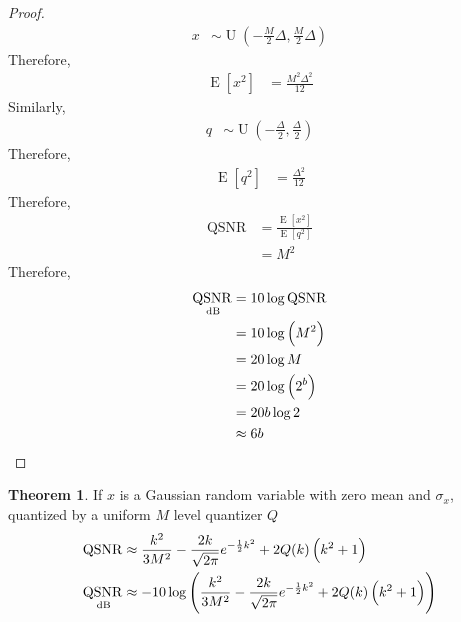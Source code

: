 \documentclass[titlepage, fleqn, a4paper, 12pt, twoside]{article}
\theoremstyle{definition}
\theoremstyle{theorem}
\newtheorem{theorem}{Theorem}
\DeclareMathOperator{\expct}{\mathrm{E}}
\DeclareMathOperator{\uniform}{\mathrm{U}}
\DeclareMathOperator{\QSNR}{\mathrm{QSNR}}
\begin{document}
\begin{proof}
	\begin{align*}
		x &\sim \uniform\left( -\frac{M}{2} \Delta,\frac{M}{2} \Delta \right)
	\end{align*}
	Therefore,
	\begin{align*}
		\expct\left[ x^2 \right] &= \frac{M^2 \Delta^2}{12}
	\end{align*}
	Similarly,
	\begin{align*}
		q &\sim \uniform\left( -\frac{\Delta}{2},\frac{\Delta}{2} \right)
	\end{align*}
	Therefore,
	\begin{align*}
		\expct\left[ q^2 \right] &= \frac{\Delta^2}{12}
	\end{align*}
	Therefore,
	\begin{align*}
		\QSNR &= \frac{\expct\left[ x^2 \right]}{\expct\left[ q^2 \right]}\\
		&= M^2
	\end{align*}
	Therefore,
	\begin{align*}
		\QSNR_{\decibel} &= 10 \log \QSNR\\
		&= 10 \log\left( M^2 \right)\\
		&= 20 \log M\\
		&= 20 \log\left( 2^b \right)\\
		&= 20 b \log 2\\
		&\approx 6 b
	\end{align*}
\end{proof}

\begin{theorem}
	If $x$ is a Gaussian random variable with zero mean and $\sigma_x$, quantized by a uniform $M$ level quantizer $Q$
	\begin{align*}
		\QSNR &\approx \frac{k^2}{3 M^2} - \frac{2 k}{\sqrt{2 \pi}} e^{-\frac{1}{2} k^2} + 2 Q(k) \left( k^2 + 1 \right)\\
		\QSNR_{\decibel} &\approx -10 \log\left( \frac{k^2}{3 M^2} - \frac{2 k}{\sqrt{2 \pi}} e^{-\frac{1}{2} k^2} + 2 Q(k) \left( k^2 + 1 \right) \right)
	\end{align*}
\end{theorem}
\end{document}
